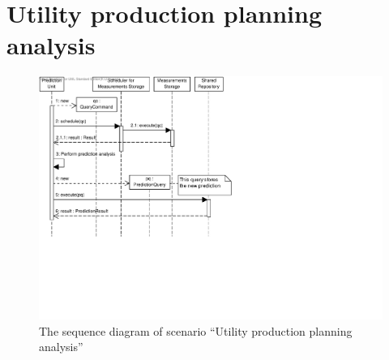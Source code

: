 \section{Utility production planning analysis}
\label{scenario:production-planning}

\begin{figure}[H]
	\begin{centering}
		\includegraphics[width=\textwidth]{figs/scenario-5-7.pdf}
		\caption{The sequence diagram of scenario ``Utility production planning
		analysis''}
		\label{fig:scenario-5-14}
	\end{centering}
\end{figure}
